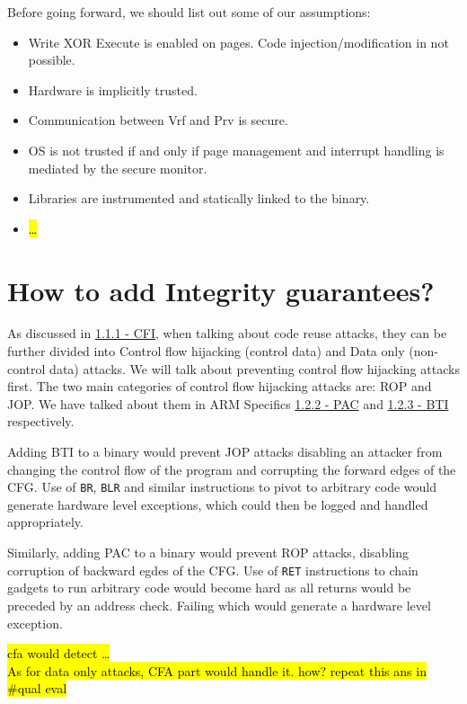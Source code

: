 \documentclass[a4paper, nobind]{templates/ociamthesis}
\providecommand{\tightlist}{%
  \setlength{\itemsep}{0pt}\setlength{\parskip}{0pt}}
\begin{document}
Before going forward, we should list out some of our assumptions:

\begin{itemize}
\tightlist
\item
  Write XOR Execute is enabled on pages. Code injection/modification in not possible.
\item
  Hardware is implicitly trusted.
\item
  Communication between Vrf and Prv is secure.
\item
  OS is not trusted if and only if page management and interrupt handling is mediated
  by the secure monitor.
\item
  Libraries are instrumented and statically linked to the binary.
\item
  \hl{\ldots{}}
\end{itemize}

\section{How to add Integrity guarantees?}\label{adding-integrity}

As discussed in \hyperref[cfi]{1.1.1 - CFI}, when talking about code reuse attacks, they can be further divided into
Control flow hijacking (control data) and Data only (non-control data) attacks.
We will talk about preventing control flow hijacking attacks first.
The two main categories of control flow hijacking attacks are: ROP and JOP.
We have talked about them in ARM Specifics \hyperref[pac-bg]{1.2.2 - PAC} and \hyperref[bti-bg]{1.2.3 - BTI} respectively.

Adding BTI to a binary would prevent JOP attacks disabling an attacker from changing
the control flow of the program and corrupting the forward edges of the CFG.
Use of \texttt{BR}, \texttt{BLR} and similar instructions to pivot to arbitrary code would generate hardware
level exceptions, which could then be logged and handled appropriately.

Similarly, adding PAC to a binary would prevent ROP attacks, disabling corruption
of backward egdes of the CFG.
Use of \texttt{RET} instructions to chain gadgets to run arbitrary code would become hard
as all returns would be preceded by an address check. Failing which would generate
a hardware level exception.

\hl{cfa would detect \ldots{}\\
As for data only attacks, CFA part would handle it. how? repeat this ans in \#qual eval}
\end{document}
